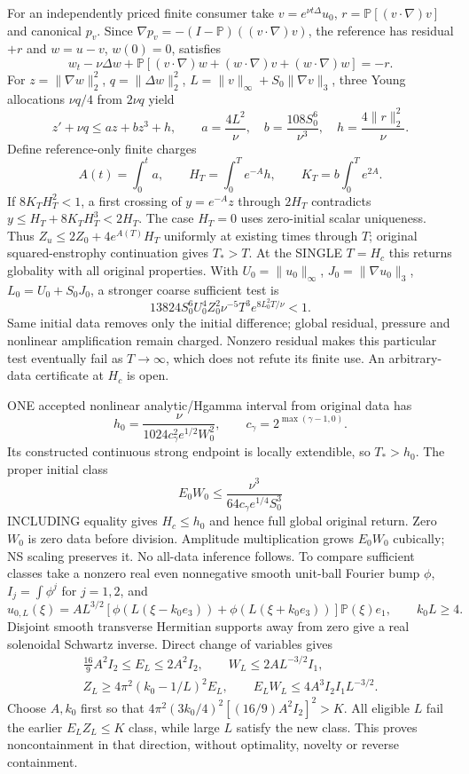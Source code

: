 \documentclass[11pt]{article}
\begin{document}
For an independently priced finite consumer take $v=e^{\nu t\Delta}u_0$,
$r=\mathbb P[(v\cdot\nabla)v]$ and canonical $p_v$.
Since $\nabla p_v=-(I-\mathbb P)((v\cdot\nabla)v)$, the reference has
residual $+r$ and $w=u-v$, $w(0)=0$, satisfies
\[
 w_t-\nu\Delta w+
 \mathbb P[(v\cdot\nabla)w+(w\cdot\nabla)v+(w\cdot\nabla)w]=-r.
\]
For $z=\|\nabla w\|_2^2$, $q=\|\Delta w\|_2^2$,
$L=\|v\|_\infty+S_0\|\nabla v\|_3$, three Young allocations
$\nu q/4$ from $2\nu q$ yield
\[
 z'+\nu q\le az+bz^3+h,\qquad
 a=\frac{4L^2}{\nu},\quad b=\frac{108S_0^6}{\nu^3},\quad
 h=\frac{4\|r\|_2^2}{\nu}.
\]
Define reference-only finite charges
\[
 A(t)=\int_0^t a,\qquad H_T=\int_0^T e^{-A}h,\qquad
 K_T=b\int_0^T e^{2A}.
\]
If $8K_TH_T^2<1$, a first crossing of $y=e^{-A}z$ through $2H_T$
contradicts $y\le H_T+8K_TH_T^3<2H_T$.
The case $H_T=0$ uses zero-initial scalar uniqueness.
Thus $Z_u\le2Z_0+4e^{A(T)}H_T$ uniformly at existing times through $T$;
original squared-enstrophy continuation gives $T_*>T$.
At the SINGLE $T=H_c$ this returns globality with all original properties.
With $U_0=\|u_0\|_\infty$, $J_0=\|\nabla u_0\|_3$,
$L_0=U_0+S_0J_0$, a stronger coarse sufficient test is
\[
 13824S_0^6U_0^4Z_0^2\nu^{-5}T^3
       e^{8L_0^2T/\nu}<1.
\]
Same initial data removes only the initial difference; global residual,
pressure and nonlinear amplification remain charged. Nonzero residual makes
this particular test eventually fail as $T\to\infty$, which does not
refute its finite use. An arbitrary-data certificate at $H_c$ is open.

ONE accepted nonlinear analytic/Hgamma interval from original data has
\[
 h_0=\frac{\nu}{1024c_\gamma^2e^{1/2}W_0^2},\qquad
 c_\gamma=2^{\max(\gamma-1,0)}.
\]
Its constructed continuous strong endpoint is locally extendible, so
$T_*>h_0$. The proper initial class
\[
 E_0W_0\le\frac{\nu^3}{64c_\gamma e^{1/4}S_0^3}
\]
INCLUDING equality gives $H_c\le h_0$ and hence full global original return.
Zero $W_0$ is zero data before division. Amplitude multiplication grows
$E_0W_0$ cubically; NS scaling preserves it. No all-data inference follows.
To compare sufficient classes take a nonzero real even nonnegative smooth
unit-ball Fourier bump $\phi$, $I_j=\int\phi^j$ for $j=1,2$, and
\[
 \widehat u_{0,L}(\xi)=AL^{3/2}
 [\phi(L(\xi-k_0e_3))+\phi(L(\xi+k_0e_3))]\mathbb P(\xi)e_1,
 \qquad k_0L\ge4.
\]
Disjoint smooth transverse Hermitian supports away from zero give a real
solenoidal Schwartz inverse. Direct change of variables gives
\[
 \begin{gathered}
 \tfrac{16}{9}A^2I_2\le E_L\le2A^2I_2,\qquad
 W_L\le2AL^{-3/2}I_1,\\
 Z_L\ge4\pi^2(k_0-1/L)^2E_L,\qquad
 E_LW_L\le4A^3I_2I_1L^{-3/2}.
 \end{gathered}
\]
Choose $A,k_0$ first so that
$4\pi^2(3k_0/4)^2[(16/9)A^2I_2]^2>K$.
All eligible $L$ fail the earlier $E_LZ_L\le K$ class, while large $L$
satisfy the new class. This proves noncontainment in that direction,
without optimality, novelty or reverse containment.
\end{document}
